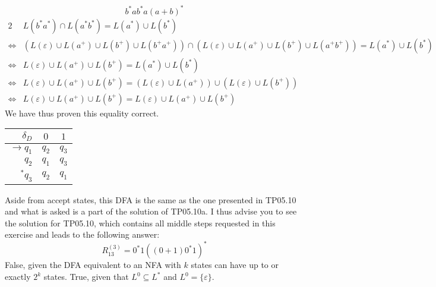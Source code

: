 \documentclass[docid=TP06]{tcom_TP}
\begin{document}
{\begin{center}
\end{center}
\begin{equation*}
	b^* a b^* a (a+b)^*
\end{equation*}
\begin{alignat*}{2}
	     & L(b^*a^*)\cap L(a^*b^*) = L(a^*) \cup L(b^*)\\
	\iff & (L(\varepsilon) \cup L(a^+) \cup L(b^+) \cup L(b^+a^+))\cap (L(\varepsilon) \cup L(a^+) \cup L(b^+) \cup L(a^+b^+)) = L(a^*) \cup L(b^*)\\
	\iff & L(\varepsilon) \cup L(a^+) \cup L(b^+) = L(a^*) \cup L(b^*)\\
	\iff & L(\varepsilon) \cup L(a^+) \cup L(b^+) = (L(\varepsilon)\cup L(a^+)) \cup (L(\varepsilon)\cup L(b^+))\\
	\iff & L(\varepsilon) \cup L(a^+) \cup L(b^+) = L(\varepsilon)\cup L(a^+) \cup L(b^+)
\end{alignat*}
We have thus proven this equality correct.
\begin{center} \begin{tabular}{r | c c}
	$\delta_D       $ & $0  $ & $1  $ \\ \hline
	$\rightarrow q_1$ & $q_2$ & $q_3$\\
	$            q_2$ & $q_1$ & $q_3$\\
	$         ^* q_3$ & $q_2$ & $q_1$
\end{tabular} \end{center}
Aside from accept states, this DFA is the same as the one presented in TP05.10 and what is asked is a part of the solution of TP05.10a. I thus advise you to see the solution for TP05.10, which contains all middle steps requested in this exercise and leads to the following answer:
\begin{equation*}
	R_{13}^{(3)} = 0^*1((0+1)0^*1)^*
\end{equation*}
False, given the DFA equivalent to an NFA with $k$ states can have up to or exactly $2^k$ states.
True, given that $L^0 \subseteq L^*$ and $L^0=\{\varepsilon\}$.
}
\end{document}

